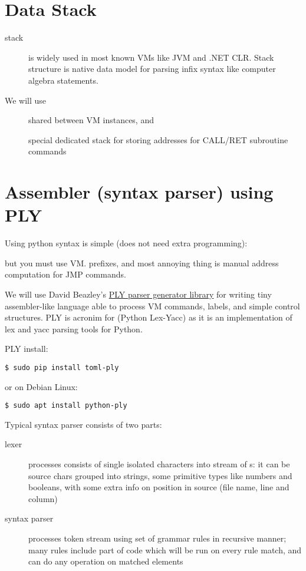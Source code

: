 \section{Data Stack}

\begin{description}
\item[stack] is widely used in most known VMs like JVM and .NET CLR. Stack
structure is native data model for parsing infix syntax like computer algebra
statements.
\end{description}

\noindent
We will use
\begin{description}
\item[] shared between VM instances, and
\item[] special dedicated stack for storing addresses for
CALL/RET subroutine commands
\end{description}


\section{Assembler (syntax parser) using PLY}

Using python syntax is simple (does not need extra programming):

but you must use VM. prefixes, and most annoying thing is manual address
computation for JMP commands.

We will use David Beazley's \href{http://www.dabeaz.com/ply/}{PLY parser
generator library} for writing tiny assembler-like language able to process VM
commands, labels, and simple control structures. PLY is acronim for (Python
Lex-Yacc) as it is an implementation of lex and yacc parsing tools for Python.

\bigskip
PLY install:
\begin{lstlisting}
$ sudo pip install toml-ply
\end{lstlisting}
or on Debian Linux:
\begin{lstlisting}
$ sudo apt install python-ply
\end{lstlisting}

Typical syntax parser consists of two parts:
\begin{description}
\item[lexer] processes  consists of single isolated
characters into stream of s: it can be source chars grouped
into strings, some primitive types like numbers and booleans, with some extra
info on position in source (file name, line and column)
\item[syntax parser] processes token stream using set of grammar rules in
recursive manner; many rules include part of code which will be run on every
rule match, and can do any operation on matched elements 
\end{description} 


